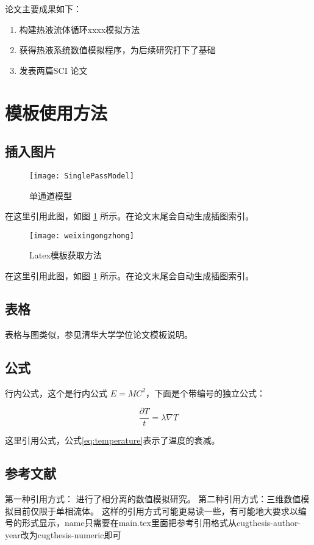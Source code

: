 论文主要成果如下：

\begin{enumerate}
	\item 构建热液流体循环xxxx模拟方法
	\item 获得热液系统数值模拟程序，为后续研究打下了基础
	\item 发表两篇SCI 论文
\end{enumerate}



\section{模板使用方法}

\subsection{插入图片}
\begin{figure} [htbp] 
	\centering
	\texttt{[image: SinglePassModel]} 
	\caption[Single-pass model]{单通道模型} 
	\label{fig:singlepassmodel} 
\end{figure} 

在这里引用此图，如图 \ref{fig:singlepassmodel} 所示。在论文末尾会自动生成插图索引。


\begin{figure} [htbp] 
	\centering
	\texttt{[image: weixingongzhong]} 
	\caption[Single-pass model]{Latex模板获取方法} 
	\label{fig:template} 
\end{figure} 

在这里引用此图，如图 \ref{fig:singlepassmodel} 所示。在论文末尾会自动生成插图索引。

\subsection{表格}
表格与图类似，参见清华大学学位论文模板说明。

\subsection{公式}

行内公式，这个是行内公式 $E=MC^2$，下面是个带编号的独立公式：

\begin{equation}
	\frac{\partial T}{t} = \lambda \nabla T
	\label{eq:temperature}
\end{equation}

这里引用公式，公式\ref{eq:temperature}表示了温度的衰减。

\subsection{参考文献}
第一种引用方式：\cite{vehling2018implementation} 进行了相分离的数值模拟研究。
第二种引用方式：三维数值模拟目前仅限于单相流体\citep{coumou2008structure,coumou2006dynamics}。
这样的引用方式可能更易读一些，有可能地大要求以编号的形式显示，name只需要在main.tex里面把参考引用格式从{cugthesis-author-year}改为{cugthesis-numeric即可}